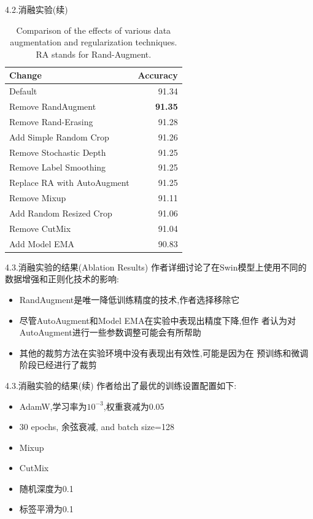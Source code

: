\documentclass[UTF8]{ctexbeamer}
\begin{document}
\begin{frame}{4.2.消融实验(续)}
  \begin{table}[h]
    \centering
    \caption{Comparison of the effects of various data augmentation and regularization techniques. RA stands for Rand-Augment.}
    \begin{tabular}{|l|r|}
    \hline
    \textbf{Change} & \textbf{Accuracy} \\
    \hline
    Default & 91.34 \\
    Remove RandAugment & \textbf{91.35} \\
    Remove Rand-Erasing & 91.28 \\
    Add Simple Random Crop & 91.26 \\
    Remove Stochastic Depth & 91.25 \\
    Remove Label Smoothing & 91.25 \\
    Replace RA with AutoAugment & 91.25 \\
    Remove Mixup & 91.11 \\
    Add Random Resized Crop & 91.06 \\
    Remove CutMix & 91.04 \\
    Add Model EMA & 90.83 \\
    \hline
    \end{tabular}
    \end{table}    
\end{frame}

\begin{frame}{4.3.消融实验的结果(Ablation Results)}
  作者详细讨论了在Swin模型上使用不同的数据增强和正则化技术的影响:
  \begin{itemize}
    \item RandAugment是唯一降低训练精度的技术,作者选择移除它
    \item 尽管AutoAugment和Model EMA在实验中表现出精度下降,但作
    者认为对AutoAugment进行一些参数调整可能会有所帮助
    \item 其他的裁剪方法在实验环境中没有表现出有效性,可能是因为在
    预训练和微调阶段已经进行了裁剪
  \end{itemize}
\end{frame}

\begin{frame}{4.3.消融实验的结果(续)}
  作者给出了最优的训练设置配置如下:
  \begin{itemize}
    \item AdamW,学习率为$10^{-3}$,权重衰减为0.05
    \item 30 epochs, 余弦衰减, and batch size=128
    \item Mixup
    \item CutMix
    \item 随机深度为0.1
    \item 标签平滑为0.1
  \end{itemize}
\end{frame}
\end{document}
